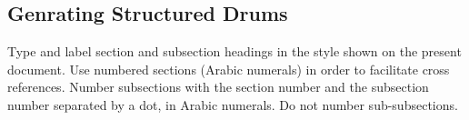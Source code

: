 \documentclass[11pt,a4paper]{article}
\begin{document}
\subsection{Genrating Structured Drums}

Type and label section and subsection headings in the
style shown on the present document.  Use numbered sections (Arabic
numerals) in order to facilitate cross references. Number subsections
with the section number and the subsection number separated by a dot,
in Arabic numerals.
Do not number sub-subsections.



%


\end{document}
